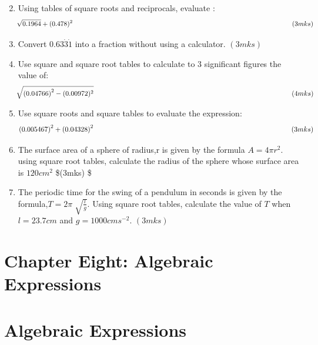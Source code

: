 \documentclass[
  letterpaper,
  DIV=11,
  numbers=noendperiod]{scrreprt}
\begin{document}
\begin{tcolorbox}
\begin{enumerate}
\[  \]
\item
  Using tables of square roots and reciprocals, evaluate : \[
  \sqrt[]{0.1964}+(0.478)^2\hspace{11.5cm} (3mks)
  \]
\item
  Convert \(0.63\dot{3}\dot{1}\) into a fraction without using a
  calculator. \hspace{4.75cm} \((3mks)\)
\item
  Use square and square root tables to calculate to 3 significant
  figures the value of: \[
  \sqrt[]{\left(0.04766\right)^2-(0.00972)^2} \hspace{10.1cm} (4mks)
  \]
\item
  Use square roots and square tables to evaluate the expression: \[
  \left(0.005467\right)^2+\left(0.04328\right)^2 \hspace{9.95cm} (3mks)
  \]
\item
  The surface area of a sphere of radius,r is given by the formula
  \(A = 4\pi r^2\). using square root tables, calculate the radius of
  the sphere whose surface area is \(120 cm^2\) \hspace{3.2cm} \$(3mks)
  \$
\item
  The periodic time for the swing of a pendulum in seconds is given by
  the formula,\(T =2\pi\sqrt[]{\frac{l}{g}}\). Using square root tables,
  calculate the value of \(T\) when \(l = 23.7cm\) and
  \(g = 1000 cms^{-2}\). \hspace*{14.2cm} \((3mks)\)
\end{enumerate}

\end{tcolorbox}


\hypertarget{chapter-eight-algebraic-expressions}{%
\chapter{Chapter Eight: Algebraic
Expressions}\label{chapter-eight-algebraic-expressions}}


\hypertarget{algebraic-expressions}{%
\chapter*{Algebraic Expressions}\label{algebraic-expressions}}

\end{document}
